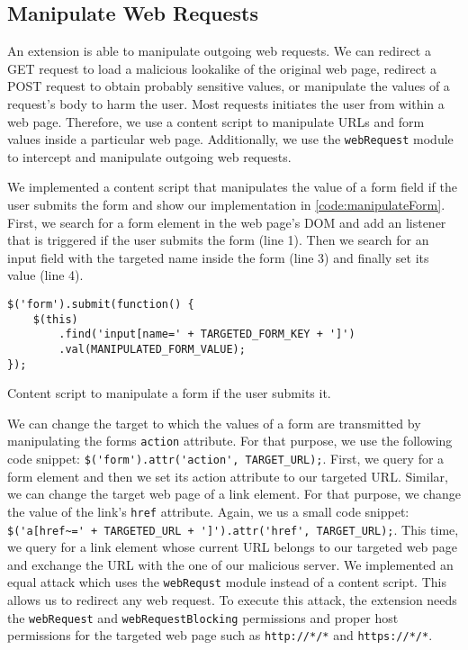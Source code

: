 \subsection{Manipulate Web Requests}

	An extension is able to manipulate outgoing web requests. We can redirect a GET request to load a malicious lookalike of the original web page, redirect a POST request to obtain probably sensitive values, or manipulate the values of a request's body to harm the user. Most requests initiates the user from within a web page. Therefore, we use a content script to manipulate URLs and form values inside a particular web page. Additionally, we use the \texttt{webRequest} module to intercept and manipulate outgoing web requests.
	
	We implemented a content script that manipulates the value of a form field if the user submits the form and show our implementation in \autoref{code:manipulateForm}. First, we search for a form element in the web page's DOM and add an listener that is triggered if the user submits the form (line 1). Then we search for an input field with the targeted name inside the form (line 3) and finally set its value (line 4).

	\begin{code}
		\begin{lstlisting}
$('form').submit(function() {
	$(this)
		.find('input[name=' + TARGETED_FORM_KEY + ']')
		.val(MANIPULATED_FORM_VALUE);
});
\end{lstlisting}
		\caption{Content script to manipulate a form if the user submits it.}
		\label{code:manipulateForm}
	\end{code}

	We can change the target to which the values of a form are transmitted by manipulating the forms \texttt{action} attribute. For that purpose, we use the following code snippet: \lstinline|$('form').attr('action', TARGET_URL);|. First, we query for a form element and then we set its action attribute to our targeted URL. Similar, we can change the target web page of a link element. For that purpose, we change the value of the link's \texttt{href} attribute. Again, we us a small code snippet: \lstinline|$('a[href~=' + TARGETED_URL + ']').attr('href', TARGET_URL);|. This time, we query for a link element whose current URL belongs to our targeted web page and exchange the URL with the one of our malicious server. We implemented an equal attack which uses the \texttt{webRequst} module instead of a content script. This allows us to redirect any web request. To execute this attack, the extension needs the \texttt{webRequest} and \texttt{webRequestBlocking} permissions and proper host permissions for the targeted web page such as \texttt{http://*/*} and \texttt{https://*/*}. 
	
